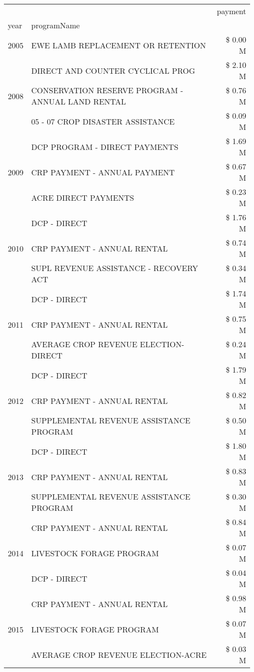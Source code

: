 \begin{tabular}{llr}
\toprule
 &  & payment \\
year & programName &  \\
\midrule
2005 & EWE LAMB REPLACEMENT OR RETENTION & \$ 0.00 M \\
\cline{1-3}
\multirow[t]{3}{*}{2008} & DIRECT AND COUNTER CYCLICAL PROG & \$ 2.10 M \\
 & CONSERVATION RESERVE PROGRAM - ANNUAL LAND RENTAL & \$ 0.76 M \\
 & 05 - 07 CROP DISASTER ASSISTANCE & \$ 0.09 M \\
\cline{1-3}
\multirow[t]{3}{*}{2009} & DCP PROGRAM - DIRECT PAYMENTS & \$ 1.69 M \\
 & CRP PAYMENT - ANNUAL PAYMENT & \$ 0.67 M \\
 & ACRE DIRECT PAYMENTS & \$ 0.23 M \\
\cline{1-3}
\multirow[t]{3}{*}{2010} & DCP - DIRECT & \$ 1.76 M \\
 & CRP PAYMENT - ANNUAL RENTAL & \$ 0.74 M \\
 & SUPL REVENUE ASSISTANCE - RECOVERY ACT & \$ 0.34 M \\
\cline{1-3}
\multirow[t]{3}{*}{2011} & DCP - DIRECT & \$ 1.74 M \\
 & CRP PAYMENT - ANNUAL RENTAL & \$ 0.75 M \\
 & AVERAGE CROP REVENUE ELECTION-DIRECT & \$ 0.24 M \\
\cline{1-3}
\multirow[t]{3}{*}{2012} & DCP - DIRECT & \$ 1.79 M \\
 & CRP PAYMENT - ANNUAL RENTAL & \$ 0.82 M \\
 & SUPPLEMENTAL REVENUE ASSISTANCE PROGRAM & \$ 0.50 M \\
\cline{1-3}
\multirow[t]{3}{*}{2013} & DCP - DIRECT & \$ 1.80 M \\
 & CRP PAYMENT - ANNUAL RENTAL & \$ 0.83 M \\
 & SUPPLEMENTAL REVENUE ASSISTANCE PROGRAM & \$ 0.30 M \\
\cline{1-3}
\multirow[t]{3}{*}{2014} & CRP PAYMENT - ANNUAL RENTAL & \$ 0.84 M \\
 & LIVESTOCK FORAGE PROGRAM & \$ 0.07 M \\
 & DCP - DIRECT & \$ 0.04 M \\
\cline{1-3}
\multirow[t]{3}{*}{2015} & CRP PAYMENT - ANNUAL RENTAL & \$ 0.98 M \\
 & LIVESTOCK FORAGE PROGRAM & \$ 0.07 M \\
 & AVERAGE CROP REVENUE ELECTION-ACRE & \$ 0.03 M \\

\end{tabular}

